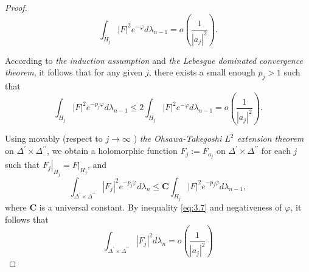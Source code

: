 \documentclass[lang=en,12pt,twoside]{textbook}
\begin{document}
\begin{proof}
\begin{equation}\label{eq:convergence}
    \int_{H_j}|F|^2 e^{-\varphi} d \lambda_{n-1}=o\left(\frac{1}{\left|a_j\right|^2}\right) .
\end{equation}


According to \textit{the induction assumption} and \textit{the Lebesgue dominated convergence theorem}, it follows that for any given $j$, there exists a small enough $p_j>1$ such that
\begin{equation}\label{eq:3.7}
    \int_{H_j}|F|^2 e^{-p_j \varphi} d \lambda_{n-1} \leq 2 \int_{H_j}|F|^2 e^{-\varphi} d \lambda_{n-1}=o\left(\frac{1}{\left|a_j\right|^2}\right) .
\end{equation}

Using movably (respect to $j \rightarrow \infty$ ) \textit{the Ohsawa-Takegoshi $L^2$ extension theorem} on $\Delta^{\prime} \times \Delta^{\prime \prime}$, we obtain a holomorphic function $F_j:=F_{a_j}$ on $\Delta^{\prime} \times \Delta^{\prime \prime}$ for each $j$ such that $\left.F_j\right|_{H_j}=\left.F\right|_{H_j}$, and
$$
\int_{\Delta^{\prime} \times \Delta^{\prime \prime}}\left|F_j\right|^2 e^{-p_j \varphi} d \lambda_n \leq \mathbf{C} \int_{H_j}|F|^2 e^{-p_j \varphi} d \lambda_{n-1},
$$
where $\mathbf{C}$ is a universal constant.
By inequality \eqref{eq:3.7} and negativeness of $\varphi$, it follows that
\begin{equation}\label{eq:3.8}
    \int_{\Delta^{\prime} \times \Delta^{\prime \prime}}\left|F_j\right|^2 d \lambda_n=o\left(\frac{1}{\left|a_j\right|^2}\right)
\end{equation}


\end{proof}
\end{document}
